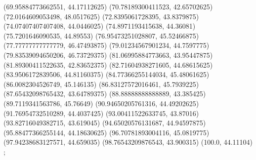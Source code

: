 {{{		(69.95884773662551, 44.17112625)
		(70.78189300411523, 42.65702625)
		(72.0164609053498, 48.0517625)
		(72.8395061728395, 43.8379875)
		(74.07407407407408, 44.0446025)
		(74.8971193415638, 44.36081)
		(75.7201646090535, 44.89553)
		(76.95473251028807, 45.52466875)
		(77.77777777777779, 46.47493875)
		(79.01234567901234, 44.7597775)
		(79.83539094650206, 46.73729375)
		(81.06995884773663, 43.95447875)
		(81.89300411522635, 42.83652375)
		(82.71604938271605, 44.68615625)
		(83.9506172839506, 44.81160375)
		(84.77366255144034, 45.48061625)
		(86.0082304526749, 45.146135)
		(86.83127572016461, 45.7939225)
		(87.65432098765432, 43.64789375)
		(88.88888888888889, 43.385425)
		(89.7119341563786, 45.76649)
		(90.94650205761316, 44.49202625)
		(91.76954732510289, 44.4037425)
		(93.00411522633745, 43.87016)
		(93.82716049382715, 43.619045)
		(94.65020576131687, 44.94597875)
		(95.88477366255144, 44.18630625)
		(96.70781893004116, 45.0819775)
		(97.94238683127571, 44.659035)
		(98.76543209876543, 43.900315)
		(100.0, 44.11104)
	};

}}
